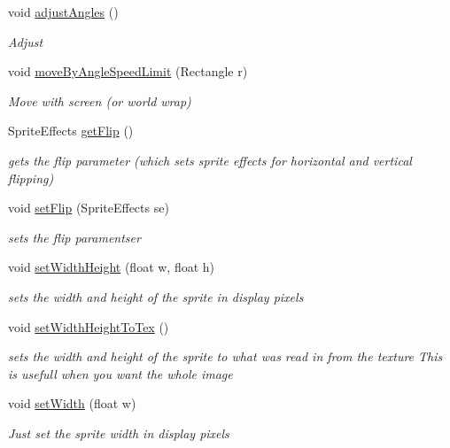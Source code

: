 \begin{DoxyCompactItemize}
void \mbox{\hyperlink{class_r_c___framework_1_1_sprite3_ad6501c04436015bde3919a8ca6d7d4a0}{adjust\+Angles}} ()
\begin{DoxyCompactList}\small\item\em Adjust \end{DoxyCompactList}\item 
void \mbox{\hyperlink{class_r_c___framework_1_1_sprite3_a07e6bec661635476eb17c60f72cfff68}{move\+By\+Angle\+Speed\+Limit}} (Rectangle r)
\begin{DoxyCompactList}\small\item\em Move with screen (or world wrap) \end{DoxyCompactList}\item 
Sprite\+Effects \mbox{\hyperlink{class_r_c___framework_1_1_sprite3_af559b399e3825aedda707573275f64df}{get\+Flip}} ()
\begin{DoxyCompactList}\small\item\em gets the flip parameter (which sets sprite effects for horizontal and vertical flipping) \end{DoxyCompactList}\item 
void \mbox{\hyperlink{class_r_c___framework_1_1_sprite3_a89a3746f82cb41211df31fc775654e8c}{set\+Flip}} (Sprite\+Effects se)
\begin{DoxyCompactList}\small\item\em sets the flip paramentser \end{DoxyCompactList}\item 
void \mbox{\hyperlink{class_r_c___framework_1_1_sprite3_ac7c6f7b2d84cfae1559eb4c84cb37f59}{set\+Width\+Height}} (float w, float h)
\begin{DoxyCompactList}\small\item\em sets the width and height of the sprite in display pixels \end{DoxyCompactList}\item 
void \mbox{\hyperlink{class_r_c___framework_1_1_sprite3_a05dbc29987c0c2552cb69e81ea3fcdab}{set\+Width\+Height\+To\+Tex}} ()
\begin{DoxyCompactList}\small\item\em sets the width and height of the sprite to what was read in from the texture This is usefull when you want the whole image \end{DoxyCompactList}\item 
void \mbox{\hyperlink{class_r_c___framework_1_1_sprite3_a6c0cc3a2227564aba7ee4d66d0c620fe}{set\+Width}} (float w)
\begin{DoxyCompactList}\small\item\em Just set the sprite width in display pixels \end{DoxyCompactList}\item 

\end{DoxyCompactItemize}

